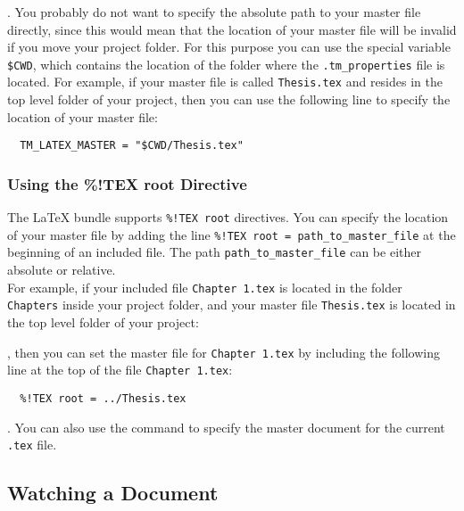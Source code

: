 \documentclass[11pt, x11names]{article}
\begin{document}
. You probably do not want to specify the absolute path to your master file directly, since this would mean that the location of your master file will be invalid if you move your project folder. For this purpose you can use the special variable \texttt{\$CWD}, which contains the location of the folder where the \texttt{.tm\_properties} file is located. For example, if your master file is called \texttt{Thesis.tex} and resides in the top level folder of your project, then you can use the following line to specify the location of your master file:

\begin{verbatim}
  TM_LATEX_MASTER = "$CWD/Thesis.tex"
\end{verbatim}

\subsubsection{Using the \%!TEX root Directive}
\label{sec:Using_TM_TEX_ROOT}

The LaTeX bundle supports \texttt{\%!TEX\ root} directives. You can specify the location of your master file by adding the line \texttt{\%!TEX\ root\ =\ path\_to\_master\_file} at the beginning of an included file. The path \texttt{path\_to\_master\_file} can be either absolute or relative.\\

For example, if your included file \texttt{Chapter 1.tex} is located in the folder \texttt{Chapters} inside your project folder, and your master file \texttt{Thesis.tex} is located in the top level folder of your project:


, then you can set the master file for \texttt{Chapter\ 1.tex} by including the following line at the top of the file \texttt{Chapter\ 1.tex}:

\begin{verbatim}
  %!TEX root = ../Thesis.tex
\end{verbatim}

. You can also use the command  to specify the master document for the current \texttt{.tex} file.

\subsection{Watching a Document}
\end{document}
